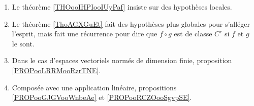 \begin{description}
		\begin{enumerate}
			\item
			      Le théorème \ref{THOooIHPIooIUyPaf} insiste sur des hypothèses locales.
			\item
			      Le théorème \ref{ThoAGXGuEt} fait des hypothèses plus globales pour s'alléger l'esprit, mais fait une récurrence pour dire que \( f\circ g\) est de classe \( C^r\) si \( f\) et \( g\) le sont.
			\item
			      Dans le cas d'espaces vectoriels normés de dimension finie, proposition \ref{PROPooLRRMooRzrTNE}.
			\item
			      Composée avec une application linéaire, propositions \ref{PROPooGJGVooWnbeAe} et \ref{PROPooRCZOooSgvpSE}.
		\end{enumerate}
\end{description}
